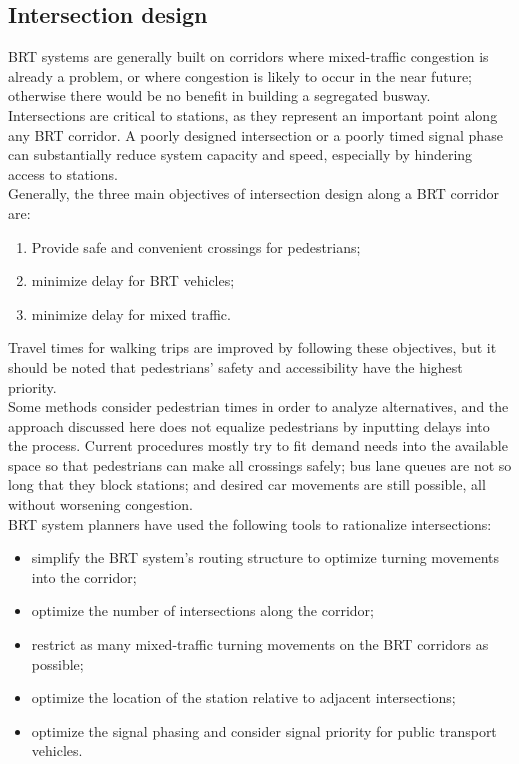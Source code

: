 \documentclass{article}
\begin{document}
\subsection{Intersection design}
BRT systems are generally built on corridors where mixed-traffic congestion is already a problem, or where congestion is likely to occur in the near future; otherwise there would be no benefit in building a segregated busway. 
Intersections are critical to stations, as they represent an important point along any BRT corridor. A poorly designed intersection or a poorly timed signal phase can substantially reduce system capacity and speed, especially by hindering access to stations.\\
Generally, the three main objectives of intersection design along a BRT corridor are: 
\begin{enumerate}
\item Provide safe and convenient crossings for pedestrians; 
\item minimize delay for BRT vehicles;
\item minimize delay for mixed traffic. 
\end{enumerate}
Travel times for walking trips are improved by following these objectives, but it should be noted that pedestrians’ safety and accessibility have the highest priority.\\
Some methods consider pedestrian times in order to analyze alternatives, and the approach discussed here does not equalize pedestrians by inputting delays into the process. Current procedures mostly try to fit demand needs into the available space so that pedestrians can make all crossings safely; bus lane queues are not so long that they block stations; and desired car movements are still possible, all without worsening congestion.\\
BRT system planners have used the following tools to rationalize intersections: 
\begin{itemize}
\item  simplify the BRT system’s routing structure to optimize turning movements into the corridor; 
\item optimize the number of intersections along the corridor; 
\item restrict as many mixed-traffic turning movements on the BRT corridors as possible; 
\item optimize the location of the station relative to adjacent intersections; 
\item optimize the signal phasing and consider signal priority for public transport vehicles.  
\end{itemize}
\end{document}
